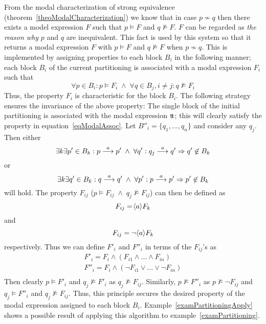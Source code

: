 From the modal characterization of strong equivalence (theorem~\ref{theoModalCharacterization}) we know that in case $p\not\sim q$ then there exists a model expression $F$ such that $p\models F$ and $q\not\models F$. $F$ can be regarded as {\em the reason why\/} $p$ and $q$ are inequivalent. This fact is used by this system so that it returns a modal expression $F$ with $p\models F$ and $q\not\models F$ when $p\not\sim q$. This is implemented by assigning properties to each block $B_i$ in the following manner; each block $B_i$ of the current partitioning is associated with a modal expression $F_i$ such that
\begin{equation}\label{eqModalAssoc}
\forall p\in B_i: p\models F_i\;\wedge\; \forall q\in B_j, i\not=j:q\not\models F_i
\end{equation}
Thus, the property $F_i$ is characteristic for the block $B_i$. The following strategy ensures the invariance of the above property: The single block of the initial partitioning is associated with the modal expression $\hbox{t}\!\hbox{t}$; this will clearly satisfy the property in equation~\ref{eqModalAssoc}. Let $B''_i=\{q_1,\ldots,q_n\}$ and consider any $q_j$. Then either
\[
\exists k\exists p'\in B_k: p\stackrel{a}{\longrightarrow}p'\;\wedge\; \forall q':q_j\stackrel{a}{\longrightarrow}q'\Rightarrow q'\not\in B_k
\]
or
\[
\exists k\exists q'\in B_k: q\stackrel{a}{\longrightarrow}q'\;\wedge\; \forall p':p\stackrel{a}{\longrightarrow}p'\Rightarrow p'\not\in B_k
\]
will hold. The property $F_{ij}$ ($p\models F_{ij}\;\wedge\; q_j\not\models F_{ij}$) can then be defined as
\[
F_{ij} = \!\left<a\right>\!F_k
\]
and
\[
F_{ij} = \neg\!\left<a\right>\!F_k
\]
respectively. Thus we can define $F'_i$ and $F''_i$ in terms of the $F_{ij}$'s as
\[
\begin{array}{c}
F'_i = F_i\wedge (F_{i1}\wedge\ldots\wedge F_{in})\\
F''_i = F_i\wedge (\neg F_{i1}\vee\ldots\vee\neg F_{in})\\
\end{array}
\]
Then clearly $p\models F'_i$ and $q_j\not\models F'_i$ as $q_j\not\models F_{ij}$. Similarly, $p\not\models F''_i$ as $p\not\models\neg F_{ij}$ and $q_j\models F''_i$ and $q_j\not\models F_{ij}$. Thus, this principle secures the desired property of the modal expression assigned to each block $B_i$. Example~\ref{examPartitioningApply} shows a possible result of applying this algorithm to example~\ref{examPartitioning}.

